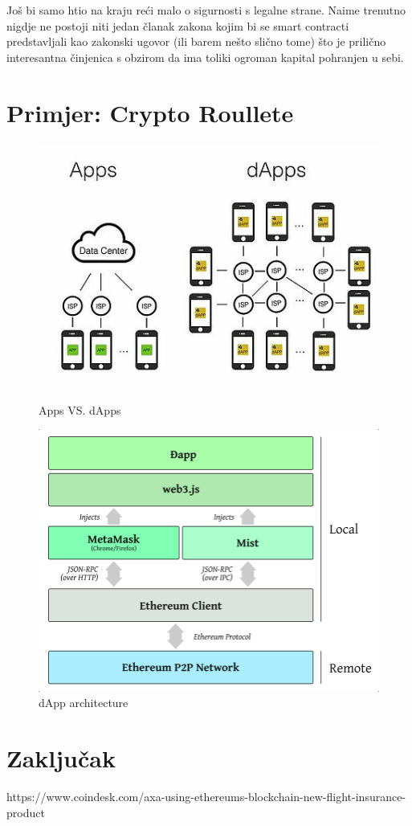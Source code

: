 \documentclass[12pt]{report}
\begin{document}
Još bi samo htio na kraju reći malo o sigurnosti s legalne strane. Naime trenutno nigdje ne postoji niti jedan članak zakona kojim bi se smart contracti predstavljali kao zakonski ugovor (ili barem nešto slično tome) što je prilično interesantna činjenica s obzirom da ima toliki ogroman kapital pohranjen u sebi.
    
\chapter{Primjer: Crypto Roullete}

\begin{figure}[h]
\centering
\includegraphics[scale=0.55]{AppsVSdApps}
\caption{Apps VS. dApps}
\label{fig:appvsdapp}
\end{figure}

\begin{figure}[h]
\centering
\includegraphics[scale=0.4]{dapp-architecture}
\caption{dApp architecture}
\label{fig:dapp}
\end{figure}

\chapter{Zaključak}

https://www.coindesk.com/axa-using-ethereums-blockchain-new-flight-insurance-product

\printbibliography
\end{document}
